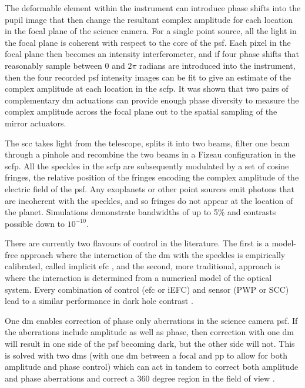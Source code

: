 \documentclass[letterpaper]{ar-1col}
\begin{document}
The deformable element within the instrument can introduce phase shifts into the pupil image that then change the resultant complex amplitude for each location in the focal plane of the science camera.
%
For a single point source, all the light in the focal plane is coherent with respect to the core of the \ac{psf}.
%
Each pixel in the focal plane then becomes an intensity interferometer, and if four phase shifts that reasonably sample between $0$ and $2\pi$ radians are introduced into the instrument, then the four recorded \ac{psf} intensity images can be fit to give an estimate of the complex amplitude at each location in the \ac{scfp}.
%
It was shown that two pairs of complementary \ac{dm} actuations can provide enough phase diversity to measure the complex amplitude across the focal plane out to the spatial sampling of the mirror actuators.

The \acl{scc} \citep[\acs{scc}; ][]{Baudoz06} takes light from the telescope, splits it into two beams, filter one beam through a pinhole and recombine the two beams in a Fizeau configuration in the \ac{scfp}.
%
All the speckles in the \ac{scfp} are subsequently modulated by a set of cosine fringes, the relative position of the fringes encoding the complex amplitude of the electric field of the \ac{psf}.
%
Any exoplanets or other point sources emit photons that are incoherent with the speckles, and so fringes do not appear at the location of the planet.
%
Simulations demonstrate \citep{Galicher10} bandwidths of up to 5\% and contrasts possible down to $10^{-10}$.

There are currently two flavours of control in the literature.
%
The first is a model-free approach where the interaction of the \ac{dm} with the speckles is empirically calibrated, called implicit \ac{efc} \citep{haffert2023implicit}, and the second, more traditional, approach is where the interaction is determined from a numerical model of the optical system.
%
Every combination of control (\ac{efc} or iEFC) and sensor (PWP or SCC) lead to a similar performance in dark hole contrast \citep{desai2024comparative}.

One \ac{dm} enables correction of phase only aberrations in the science camera \ac{psf}.
%
If the aberrations include amplitude as well as phase, then correction with one \ac{dm} will result in one side of the \ac{psf} becoming dark, but the other side will not.
%
This is solved with two \acp{dm} (with one \ac{dm} between a focal and \ac{pp} to allow for both amplitude and phase control) which can act in tandem to correct both amplitude and phase aberrations and correct a 360 degree region in the field of view \citep{pueyo2009optimal}.
\end{document}
